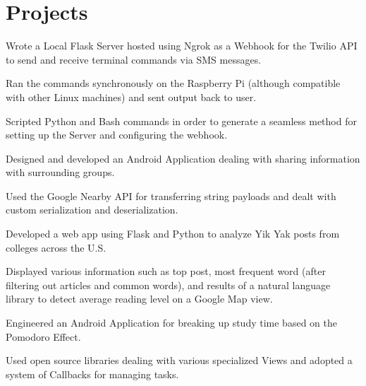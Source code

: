 \documentclass[]{format}
\begin{document}
\begin{minipage}[t]{0.66\textwidth}
\section{Projects}
\begin{tightemize}
\item Wrote a Local Flask Server hosted using Ngrok as a Webhook for the Twilio API to send and receive terminal commands via SMS messages.
\item Ran the commands synchronously on the Raspberry Pi (although compatible with other Linux machines) and sent output back to user.
\item Scripted Python and Bash commands in order to generate a seamless method for setting up the Server and configuring the webhook.
\end{tightemize}
\sectionsep

\begin{tightemize}
\item Designed and developed an Android Application dealing with sharing information with surrounding groups. 
\item Used the Google Nearby API for transferring string payloads and dealt with custom serialization and deserialization.
\end{tightemize}
\sectionsep

\begin{tightemize}
\item Developed a web app using Flask and Python to analyze Yik Yak posts from colleges across the U.S.
\item Displayed various information such as top post, most frequent word (after filtering out articles and common words),
and results of a natural language library to detect average reading level on a Google Map view.
\end{tightemize}
\sectionsep

\begin{tightemize}
\item Engineered an Android Application for breaking up study time based on the Pomodoro Effect.
\item Used open source libraries dealing with various specialized Views and adopted a system of Callbacks for managing tasks.
\end{tightemize}
\end{minipage} 
\end{document}
